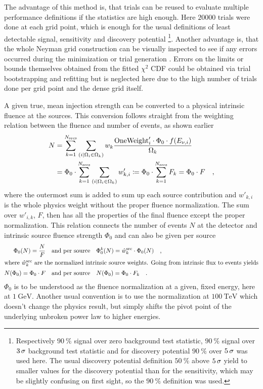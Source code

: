 The advantage of this method is, that trials can be reused to evaluate multiple performance definitions if the statistics are high enough.
Here $\num{20000}$ trials were done at each grid point, which is enough for the usual definitions of least detectable signal, sensitivity and discovery potential \footnote{Respectively $\SI{90}{\percent}$ signal over zero background test statistic, $\SI{90}{\percent}$ signal over $\num{3}\,\sigma$ background test statistic and for discovery potential $\SI{90}{\percent}$ over $\num{5}\,\sigma$ was used here. The usual discovery potential definition $\SI{50}{\percent}$ above $\num{5}\,\sigma$ yield to smaller values for the discovery potential than for the sensitivity, which may be slightly confusing on first sight, so the $\SI{90}{\percent}$ definition was used.}.
Another advantage is, that the whole Neyman grid construction can be visually inspected to see if any errors occurred during the minimization or trial generation .
Errors on the limits or bounds themselves obtained from the fitted $\chi^2$ CDF could be obtained via trial bootstrapping and refitting but is neglected here due to the high number of trials done per grid point and the dense grid itself.

A given true, mean injection strength can be converted to a physical intrinsic fluence at the sources.
This conversion follows straight from the weighting relation between the fluence and number of events, as shown earlier
\begin{align}
  N &= \sum_{k=1}^{N_\text{srcs}} \sum_{(i|\Omega_i \in \Omega_k)}
    w_k\frac{\text{OneWeight}'_i\cdot\Phi_0\cdot f(E_{\nu,i})}{\Omega_k} \\
  &= \Phi_0 \cdot
      \sum_{k=1}^{N_\text{srcs}}
      \sum_{(i|\Omega_i \in \Omega_k)} w'_{k,i}
  \coloneqq \Phi_0 \cdot \sum_{k=1}^{N_\text{srcs}} F_k = \Phi_0 \cdot F
  \quad\text{,}
\end{align}
where the outermost sum is added to sum up each source contribution and $w'_{k,i}$ is the whole physics weight without the proper fluence normalization.
The sum over $w'_{i,k}$, $F$, then has all the properties of the final fluence except the proper normalization.
This relation connects the number of events $N$ at the detector and intrinsic source fluence strength $\Phi_0$ and can also be given per source
\begin{align}
  \Phi_0(N) = \frac{N}{F}
    &\quad\text{and per source}\quad
    \Phi_0^k(N) = \hat{w}_k^\text{src} \cdot \Phi_0(N)
    \quad\text{,} \\
  \intertext{where $\hat{w}_k^\text{src}$ are the normalized intrinsic source weights. Going from intrinsic flux to events yields}
  N(\Phi_0) = \Phi_0 \cdot F
    &\quad\text{and per source}\quad
    N(\Phi_0) = \Phi_0 \cdot F_k
  \quad\text{.}
\end{align}
$\Phi_0$ is to be understood as the fluence normalization at a given, fixed energy, here at $\SI{1}{\GeV}$.
Another usual convention is to use the normalization at $\SI{100}{\TeV}$ which doesn't change the physics result, but simply shifts the pivot point of the underlying unbroken power law to higher energies.

